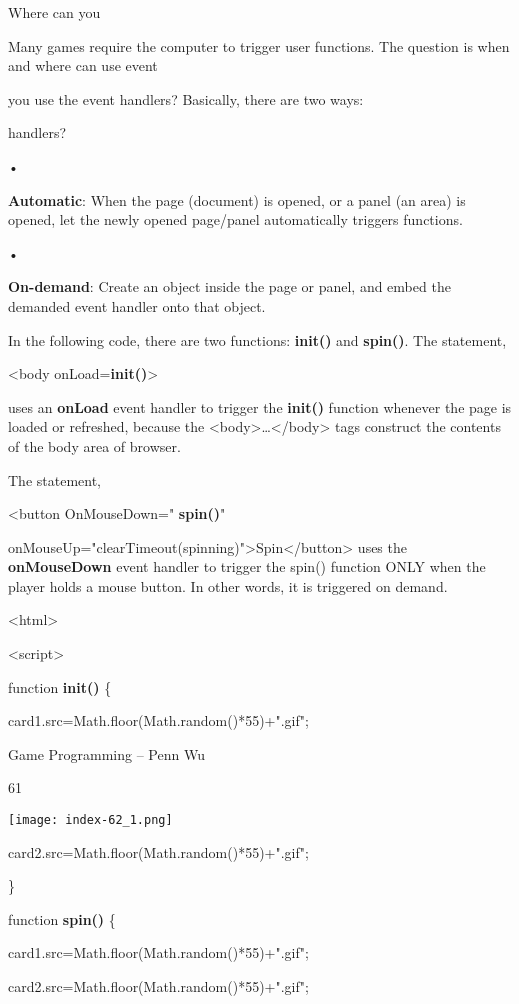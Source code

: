 \documentclass[
]{article}
\begin{document}
Where can you

Many games require the computer to trigger user functions. The question
is when and where can use event

you use the event handlers? Basically, there are two ways:

handlers?

•

\textbf{Automatic}: When the page (document) is opened, or a panel (an
area) is opened, let the newly opened page/panel automatically triggers
functions.

•

\textbf{On-demand}: Create an object inside the page or panel, and embed
the demanded event handler onto that object.

In the following code, there are two functions: \textbf{init()} and
\textbf{spin()}. The statement,

\textless body onLoad=\textbf{init()}\textgreater{}

uses an \textbf{onLoad} event handler to trigger the \textbf{init()}
function whenever the page is loaded or refreshed, because the
\textless body\textgreater\ldots\textless/body\textgreater{} tags
construct the contents of the body area of browser.

The statement,

\textless button OnMouseDown=" \textbf{spin()}"

onMouseUp="clearTimeout(spinning)"\textgreater Spin\textless/button\textgreater{}
uses the \textbf{onMouseDown} event handler to trigger the spin()
function ONLY when the player holds a mouse button. In other words, it
is triggered on demand.

\textless html\textgreater{}

\textless script\textgreater{}

function \textbf{init()} \{

card1.src=Math.floor(Math.random()*55)+".gif";

Game Programming -- Penn Wu

61

\protect\hypertarget{index_split_005.htmlux5cux23p62}{}{}\texttt{[image: index-62\_1.png]}

card2.src=Math.floor(Math.random()*55)+".gif";

\}

function \textbf{spin()} \{

card1.src=Math.floor(Math.random()*55)+".gif";

card2.src=Math.floor(Math.random()*55)+".gif";
\end{document}
